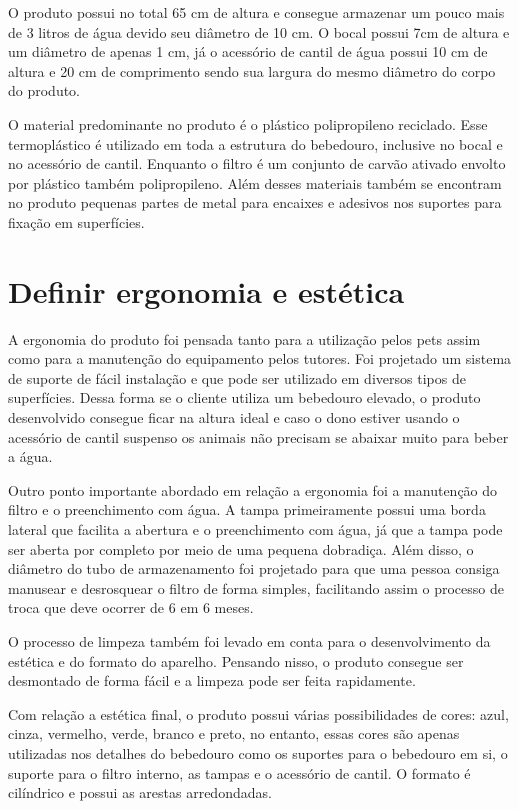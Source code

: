 \documentclass[
	12pt,				%
	openright,			%
	oneside,			%
	a4paper,			%
	english,			%
	french,				%
	spanish,			%
	brazil				%
	]{abntex2}
\begin{document}
O produto possui no total 65 cm de altura e consegue armazenar um pouco mais de 3 litros de água devido seu diâmetro de 10 cm. O bocal possui 7cm de altura e um diâmetro de apenas 1 cm, já o acessório de cantil de água possui 10 cm de altura e 20 cm de comprimento sendo sua largura do mesmo diâmetro do corpo do produto. 

O material predominante no produto é o plástico polipropileno reciclado. Esse termoplástico é utilizado em toda a estrutura do bebedouro, inclusive no bocal e no acessório de cantil. Enquanto o filtro é um conjunto de carvão ativado envolto por plástico também polipropileno. Além desses materiais também se encontram no produto pequenas partes de metal para encaixes e adesivos nos suportes para fixação em superfícies.


\section{Definir ergonomia e estética}

A ergonomia do produto foi pensada tanto para a utilização pelos pets assim como para a manutenção do equipamento pelos tutores. Foi projetado um sistema de suporte de fácil instalação e que pode ser utilizado em diversos tipos de superfícies. Dessa forma se o cliente utiliza um bebedouro elevado, o produto desenvolvido consegue ficar na altura ideal e caso o dono estiver usando o acessório de cantil suspenso os animais não precisam se abaixar muito para beber a água. 

Outro ponto importante abordado em relação a ergonomia foi a manutenção do filtro e o preenchimento com água. A tampa primeiramente possui uma borda lateral que facilita a abertura e o preenchimento com água, já que a tampa pode ser aberta por completo por meio de uma pequena dobradiça. Além disso, o diâmetro do tubo de armazenamento foi projetado para que uma pessoa consiga manusear e desrosquear o filtro de forma simples, facilitando assim o processo de troca que deve ocorrer de 6 em 6 meses. 

O processo de limpeza também foi levado em conta para o desenvolvimento da estética e do formato do aparelho. Pensando nisso, o produto consegue ser desmontado de forma fácil e a limpeza pode ser feita rapidamente.

Com relação a estética final, o produto possui várias possibilidades de cores: azul, cinza, vermelho, verde, branco e preto, no entanto, essas cores são apenas utilizadas nos detalhes do bebedouro como os suportes para o bebedouro em si, o suporte para o filtro interno, as tampas e o acessório de cantil. O formato é cilíndrico e possui as arestas arredondadas. 
\end{document}
